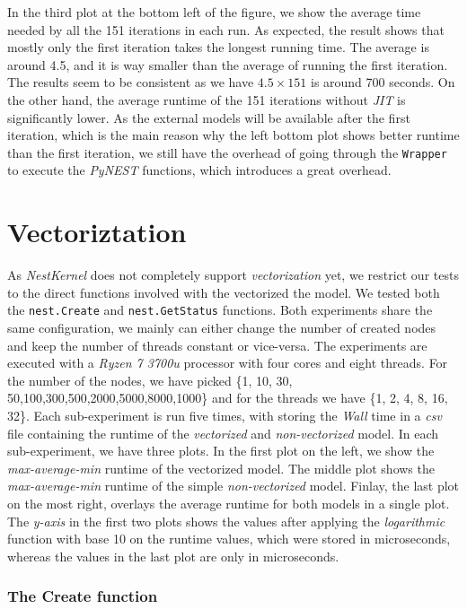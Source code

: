 In the third plot at the bottom left of the figure, we show the average time needed by all the 151 iterations in each run. As expected, the result shows that mostly only the first iteration takes the longest running time. The average is around 4.5, and it is way smaller than the average of running the first iteration. The results seem to be consistent as we have $4.5 \times 151$ is around 700 seconds. On the other hand, the average runtime of the 151 iterations without \emph{JIT} is significantly lower. As the external models will be available after the first iteration, which is the main reason why the left bottom plot shows better runtime than the first iteration, we still have the overhead of going through the \texttt{Wrapper} to execute the \emph{PyNEST} functions, which introduces a great overhead.



\section{Vectoriztation}

As \emph{NestKernel} does not completely support \emph	{vectorization} yet, we restrict our tests to the direct functions involved with the vectorized the model. We tested both the \texttt{nest.Create} and \texttt{nest.GetStatus} functions. Both experiments share the same configuration, we mainly can either change the number of created nodes and keep the number of threads constant or vice-versa. The experiments are executed with a \emph{Ryzen 7 3700u} processor with four cores and eight threads.
For the number of the nodes, we have picked \{1, 10, 30, 50,100,300,500,2000,5000,8000,1000\} and for the threads we have \{1, 2, 4, 8, 16, 32\}. Each sub-experiment is run five times, with storing the \emph{Wall} time in a \emph{csv} file containing the runtime of the \emph{vectorized} and \emph{non-vectorized} model. In each sub-experiment, we have three plots. In the first plot on the left, we show the \emph{max-average-min} runtime of the vectorized model. The middle plot shows the \emph{max-average-min} runtime of the simple \emph{non-vectorized} model. Finlay, the last plot on the most right, overlays the average runtime for both models in a single plot. The \emph{y-axis} in the first two plots shows the values after applying the \emph{logarithmic} function with base 10 on the runtime values, which were stored in microseconds, whereas the values in the last plot are only in microseconds.

\subsubsection{The Create function}

